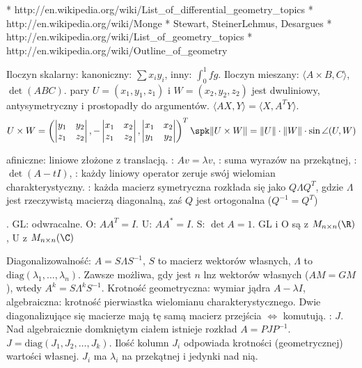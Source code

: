 * http://en.wikipedia.org/wiki/List_of_differential_geometry_topics
* http://en.wikipedia.org/wiki/Monge%
* Stewart, SteinerLehmus, Desargues
* http://en.wikipedia.org/wiki/List_of_geometry_topics
* http://en.wikipedia.org/wiki/Outline_of_geometry







Iloczyn skalarny: kanoniczny: $\sum x_i y_i$, inny: $\int_0^1 fg$.
Iloczyn mieszany: $\langle A \times B, C \rangle$, $\det(ABC)$.
 pary $U = (x_1, y_1, z_1)$ i $W = (x_2, y_2, z_2)$ jest dwuliniowy, antysymetryczny i prostopadły do argumentów.
\hfill $\langle AX, Y \rangle = \langle X, A^TY\rangle$.
\[
	U \times W = \left(\begin{vmatrix} y_1 & y_2 \\z_1 & z_2\end{vmatrix}, - \begin{vmatrix} x_1 & x_2 \\z_1 & z_2\end{vmatrix}, \begin{vmatrix} x_1 & x_2 \\y_1 & y_2\end{vmatrix}\right)^T\spk
	\|U\times W\| = \|U\| \cdot \|W\| \cdot \sin \angle (U,W)
\]


afiniczne: liniowe złożone z translacją.
: $Av = \lambda v$, : suma wyrazów na przekątnej, : $\det(A-t I)$, : każdy liniowy operator zeruje swój wielomian charakterystyczny.
: każda macierz symetryczna rozkłada się jako $Q \Lambda Q^T$, gdzie $\Lambda$ jest rzeczywistą macierzą diagonalną, zaś $Q$ jest ortogonalna ($Q^{-1} = Q^T$)


.
GL: odwracalne.
O: $AA^T = I$.
U: $AA^* = I$.
S: $\det A = 1$.
GL i O są z $M_{n \times n}(\R)$, U z $M_{n \times n}(\C)$

Diagonalizowalność: $A = S \Lambda S^{-1}$, $S$ to macierz wektorów własnych, $\Lambda$ to $\text{diag}(\lambda_1, \dots, \lambda_n)$.
Zawsze możliwa, gdy jest $n$ lnz wektorów własnych ($AM = GM$), wtedy $A^k=S \Lambda^k S^{-1}$.
Krotność geometryczna: wymiar jądra $A - \lambda I$, algebraiczna: krotność pierwiastka wielomianu charakterystycznego.
Dwie diagonalizujące się macierze mają tę samą macierz przejścia $\Leftrightarrow$ komutują.
: $J$.
Nad algebraicznie domkniętym ciałem istnieje rozkład $A = P J P^{-1}$.
$J = \text{diag}(J_1, J_2, \dots, J_k)$.
Ilość kolumn $J_i$ odpowiada krotności (geometrycznej) wartości własnej.
$J_i$ ma $\lambda_i$ na przekątnej i jedynki nad nią.

